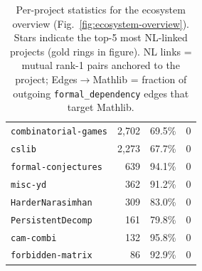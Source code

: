 \begin{table}[h]
\begin{tabular}{lrrr}
    \texttt{combinatorial-games}             &   2,702 &  69.5\% &                              0 \\
    \texttt{cslib}                           &   2,273 &  67.7\% &                              0 \\
    \texttt{formal-conjectures}              &     639 &  94.1\% &                              0 \\
    \texttt{misc-yd}                         &     362 &  91.2\% &                              0 \\
    \texttt{HarderNarasimhan}                &     309 &  83.0\% &                              0 \\
    \texttt{PersistentDecomp}                &     161 &  79.8\% &                              0 \\
    \texttt{cam-combi}                       &     132 &  95.8\% &                              0 \\
    \texttt{forbidden-matrix}                &      86 &  92.9\% &                              0 \\
    \bottomrule
  \end{tabular}
  \caption{Per-project statistics for the ecosystem overview (Fig.~\ref{fig:ecosystem-overview}).
           Stars indicate the top-5 most NL-linked projects (gold rings in figure).
           NL links = mutual rank-1 pairs anchored to the project; Edges$\to$Mathlib =
           fraction of outgoing \texttt{formal\_dependency} edges that target Mathlib.}
  \label{tab:ecosystem-overview}
\end{table}
